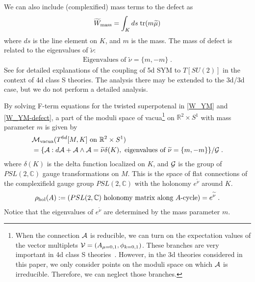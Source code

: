 \documentclass[a4paper,11pt]{article}
\def\cA{\mathcal{A}}
\def\CA{{\cal A}}
\def\CG{{\cal G}}
\begin{document}
We can also include (complexified) mass terms to the defect as 
%
\begin{align}
\widetilde{W}_{\rm mass} = \int_K ds \;\textrm{tr} (m \widetilde{\mu} ) \label{W_mass}
\end{align}
%
where $ds$ is the line element on $K$, and $m$ is the mass. The mass of defect is related to the eigenvalues of $\widetilde{\nu}$:
%
\begin{align}
\textrm{Eigenvalues of $\widetilde{\nu}$} = \{ m, -m \}\;.
\end{align}
%
See \cite{Yonekura:2013mya} for detailed explanations of the coupling of 5d SYM to $T[SU(2)]$ in the context of 4d class S theories. 
The analysis there may be extended to the 3d/3d case,
but we do not perform a detailed analysis.

By solving F-term equations for the twisted superpotenal in  \eqref{W_YM} and \eqref{W_YM-defect}, 
a part of the moduli space of vacua\footnote{When the connection $\CA$ is reducible, we can turn on the expectation values of 
the vector multiplets ${\cal V}= (A_{\mu=0,1}, \phi_{k=0,1})$. These branches are very important in 4d class S theories~\cite{Yonekura:2013mya,Xie:2014pua}.
However, in the 3d theories considered in this paper, we only consider points on the moduli space on which $\CA$ is irreducible.
Therefore, we can neglect those branches.
} on $\mathbb{R}^2\times S^1$ with mass parameter $m$ is given by 
%
\begin{align}
\begin{split}
&\mathcal{M}_{\rm vacua} (\textrm{$T^{6d}[M,K]$ on $\mathbb{R}^2\times S^1$}) 
\\
&= \{ \cA : d\cA+\cA\wedge \cA =\widetilde{ \nu} \delta (K) ,~\text{eigenvalues of } \widetilde{\nu}=\{m,-m \}   \}/ \CG %
\label{flat connections}\;.
\end{split}
\end{align}
%
where $\delta(K)$ is  the  delta  function  localized on $K$, and $\CG$ is the group of $PSL(2,\mathbb{C}) $ gauge transformations on $M$.   
This  is  the  space  of  flat  connections  of  the complexifield gauge group $PSL(2,\mathbb{C})$ with the holonomy $e^{\widetilde{\nu} }$ around $K$.
%
\begin{align}
 \rho_{\rm hol}(A):=(\textrm{$PSL(2,\mathbb{C})$ holonomy matrix along $A$-cycle})= e^{\widetilde{\nu } }\;. \label{HolA and nu}
\end{align}
%
Notice that the eigenvalues of $e^{\widetilde{\nu}}$ are determined by the mass parameter $m$.
\end{document}

